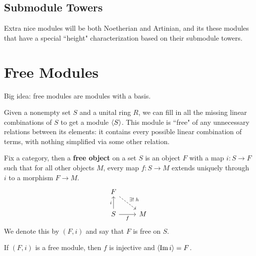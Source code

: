 \documentclass[twoside,10pt]{report}
\begin{document}
\subsection{Submodule Towers}













Extra nice modules will be both Noetherian and Artinian, and its these modules that have a special ``height" characterization based on their submodule towers.


\section{Free Modules}

\begin{note}[]
Big idea: free modules are modules with a basis.
\end{note}

Given a nonempty set $S$ and a unital ring $R$, we can fill in all the missing linear combinations of $S$ to get a module $\langle S \rangle$. This module is ``free" of any unnecessary relations between its elements: it contains every possible linear combination of terms, with nothing simplified via some other relation.

\begin{defn}[]
Fix a category, then a \textbf{free object} on a set $S$ is an object $F$ with a map $i:S\to F$ such that for all other objects $M$, every map $f:S\to M$ extends uniquely through $i$ to a morphism $F\to M$.
\[
\begin{tikzcd}
	F \arrow[dr, dashed, "\exists! \; h"] \\
	S \uar{i}\rar["f"'] & M
\end{tikzcd}
\] 
We denote this by $(F, i)$ and say that $F$ is free on $S$.
\end{defn}

\begin{prop}
	If $(F,i)$ is a free module, then $f$ is injective and $\langle \operatorname{Im} i \rangle= F$.
\end{prop}
\end{document}
